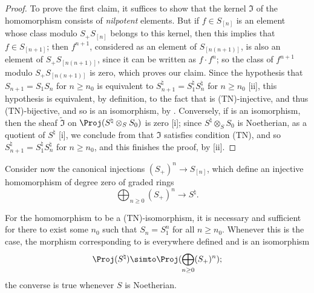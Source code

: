 \begin{proof}
To prove the first claim, it suffices  to show that the kernel $\mathfrak{I}$ of the homomorphism  consists of \emph{nilpotent} elements.
But if $f\in S_{[n]}$ is an element whose class modulo $S_+S_{[n]}$ belongs to this kernel, then this implies that $f\in S_{[n+1]}$;
then $f^{n+1}$, considered as an element of $S_{[n(n+1)]}$, is also an element of $S_+S_{[n(n+1)]}$, since it can be written as $f\cdot f^n$;
so the class of $f^{n+1}$ modulo $S_+S_{[n(n+1)]}$ is zero, which proves our claim.
Since the hypothesis that $S_{n+1}=S_1S_n$ for $n\geq n_0$ is equivalent to $S_{n+1}^\natural=S_1^\natural S_n^\natural$ for $n\geq n_0$ [ii], this hypothesis is equivalent, by definition, to the fact that  is (TN)-injective, and thus (TN)-bijective, and so  is an isomorphism, by .
Conversely, if  is an isomorphism, then the sheaf $\widetilde{\mathfrak{I}}$ on $\Proj(S^\natural\otimes_S S_0)$ is zero [i];
since $S^\natural\otimes_S S_0$ is Noetherian, as a quotient of $S^\natural$ [i], we conclude from  that $\mathfrak{I}$ satisfies condition (TN), and so $S_{n+1}^\natural=S_1^\natural S_n^\natural$ for $n\geq n_0$, and this finishes the proof, by [ii].
\end{proof}

\begin{env}[8.2.13]
\label{II.8.2.13}
Consider now the canonical injections $(S_+)^n\to S_{[n]}$, which define an injective homomorphism of degree zero of graded rings
\[
\label{II.8.2.13.1}
  \bigoplus_{n\geq0} (S_+)^n \to S^\natural.
\tag{8.2.13.1}
\]
\end{env}

\begin{proposition}[8.2.14]
\label{II.8.2.14}
For the homomorphism  to be a (TN)-isomorphism, it is necessary and sufficient for there to exist some $n_0$ such that $S_n=S_1^n$ for all $n\geq n_0$.
Whenever this is the case, the morphism corresponding to  is everywhere defined and is an isomorphism
\[
  \Proj(S^\natural) \simto \Proj(\bigoplus_{n\geq0}(S_+)^n);
\]
the converse is true whenever $S$ is Noetherian.
\end{proposition}

